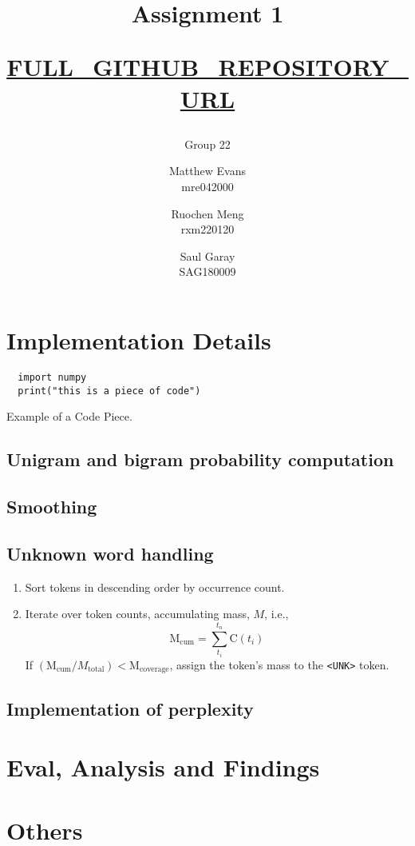 \documentclass[a4paper]{article}
\title{Assignment 1 \\ \begin{small}\url{FULL_GITHUB_REPOSITORY_URL}\end{small}}
\author{Group 22 \and Matthew Evans \\ mre042000 \and Ruochen Meng \\ rxm220120 \and Saul Garay \\ SAG180009}
\date{}
\begin{document}
\maketitle
% 


\section{Implementation Details}

\begin{listing}[ht]
  \begin{verbatim}
  import numpy  
  print("this is a piece of code")
\end{verbatim}
  \caption{Example of a Code Piece.}
  \label{lst:eg}
\end{listing}

\subsection{Unigram and bigram probability computation}

\subsection{Smoothing}

\subsection{Unknown word handling}

\begin{enumerate}
  \item Sort tokens in descending order by occurrence count.
  \item Iterate over token counts, accumulating mass, \(M\), i.e.,
        \[
          \text{M}_{\text{cum}} = \sum_{t_i}^{t_n}\text{C}(t_i)
        \]
        If \((\text{M}_{\text{cum}} / M_{\text{total}}) < \text{M}_{\text{coverage}}\), assign the token's mass to the \texttt{<UNK>} token.
\end{enumerate}

\subsection{Implementation of perplexity}

\section{Eval, Analysis and Findings}

\section{Others}
\end{document}
